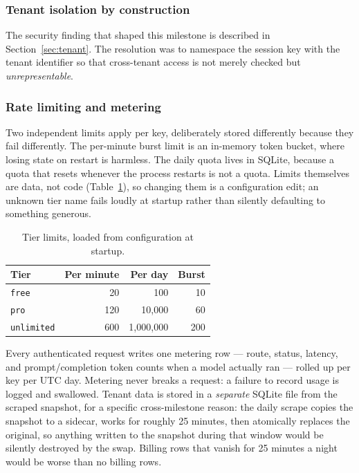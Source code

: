 \documentclass[11pt,a4paper]{article}
\newcommand{\code}[1]{\texttt{\small #1}}
\begin{document}
\subsubsection*{Tenant isolation by construction}

The security finding that shaped this milestone is described in
Section~\ref{sec:tenant}. The resolution was to namespace the session key with
the tenant identifier so that cross-tenant access is not merely checked but
\emph{unrepresentable}.

\subsubsection*{Rate limiting and metering}

Two independent limits apply per key, deliberately stored differently because
they fail differently. The per-minute burst limit is an in-memory token
bucket, where losing state on restart is harmless. The daily quota lives in
SQLite, because a quota that resets whenever the process restarts is not a
quota. Limits themselves are data, not code (Table~\ref{tab:tiers}), so
changing them is a configuration edit; an unknown tier name fails loudly at
startup rather than silently defaulting to something generous.

\begin{table}[htbp]
\centering
\caption{Tier limits, loaded from configuration at startup.}
\label{tab:tiers}
\small
\begin{tabular}{@{}l r r r@{}}
\toprule
\textbf{Tier} & \textbf{Per minute} & \textbf{Per day} & \textbf{Burst} \\
\midrule
\code{free} & 20 & 100 & 10 \\
\code{pro} & 120 & 10{,}000 & 60 \\
\code{unlimited} & 600 & 1{,}000{,}000 & 200 \\
\bottomrule
\end{tabular}
\end{table}

Every authenticated request writes one metering row --- route, status,
latency, and prompt/completion token counts when a model actually ran ---
rolled up per key per UTC day. Metering never breaks a request: a failure to
record usage is logged and swallowed. Tenant data is stored in a
\emph{separate} SQLite file from the scraped snapshot, for a specific
cross-milestone reason: the daily scrape copies the snapshot to a sidecar,
works for roughly 25 minutes, then atomically replaces the original, so
anything written to the snapshot during that window would be silently
destroyed by the swap. Billing rows that vanish for 25 minutes a night would
be worse than no billing rows.
\end{document}
